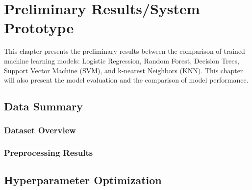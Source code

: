 

\chapter{Preliminary Results/System Prototype}
This chapter presents the preliminary results between the comparison of trained machine learning models: Logistic Regression, Random Forest,  Decision Trees, Support Vector Machine (SVM), and k-nearest Neighbors (KNN).  This chapter will also present the model evaluation and the comparison of model performance. 

\section{Data Summary}
\subsection{Dataset Overview}

\subsection{Preprocessing Results}

\section{Hyperparameter Optimization}

\begin{table}[H]
	\centering
	\caption{Hyperparameter Optimization}
	\label{tab:hyperparameter-optimization}
\end{table}


